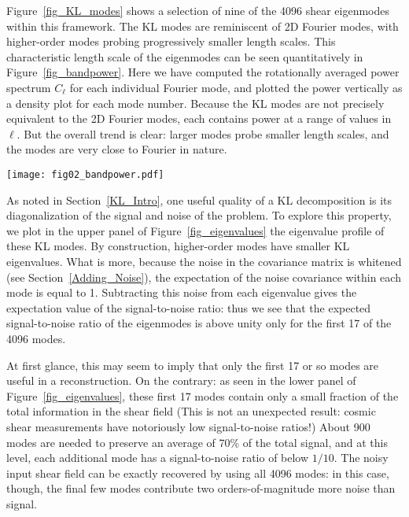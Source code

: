 Figure~\ref{fig_KL_modes} shows a selection of
nine of the 4096 shear eigenmodes within
this framework.  The KL modes are reminiscent of 2D Fourier modes, with
higher-order modes probing progressively smaller length scales.  
This characteristic length scale of the eigenmodes
can be seen quantitatively in Figure~\ref{fig_bandpower}.  
Here we have computed the rotationally averaged
power spectrum $C_\ell$ for each individual Fourier mode, and plotted the
power vertically as a density plot for each mode number.  
Because the KL modes are
not precisely equivalent to the 2D Fourier modes, each contains power at
a range of values in $\ell$.  But the overall trend is clear: larger modes
probe smaller length scales, and the modes are very close to Fourier in
nature.

\begin{figure*}
 \centering
 \texttt{[image: fig02\_bandpower.pdf]}
 \caption[The normalized power spectrum of each KL mode]
 {The normalized power spectrum of each KL mode.  For constant
   mode number, the figure represents a histogram of the power in that KL
   mode, normalized to a constant total power.  KL modes represent a 
   linear combination of Fourier modes, so that the power in each KL 
   mode is spread over a range of $\ell$ values.  Nevertheless,
   the general trend is clear: larger mode numbers are associated with
   larger wave numbers, and thus smaller length scales.
   \label{fig_bandpower} }
\end{figure*}

As noted in Section~\ref{KL_Intro}, one useful quality of a KL decomposition
is its diagonalization of the signal and noise of the problem.
To explore this property, we plot in the upper panel of 
Figure~\ref{fig_eigenvalues} the eigenvalue profile 
of these KL modes. By construction, higher-order modes 
have smaller KL eigenvalues.  What is more,
because the noise in the covariance matrix is whitened 
(see Section~\ref{Adding_Noise}), the expectation of the noise covariance
within each mode is equal to 1.  Subtracting this noise from each eigenvalue 
gives the expectation value of the signal-to-noise ratio: 
thus we see that the expected
signal-to-noise ratio of the eigenmodes is above unity only for the first
17 of the 4096 modes.

At first glance, this may seem to imply that only the first 17 or so modes
are useful in a reconstruction.  On the contrary: as seen in the lower panel
of Figure~\ref{fig_eigenvalues}, these first 17 modes contain only a
small fraction of the total information in the shear field (This is not 
an unexpected result: cosmic shear measurements have 
notoriously low signal-to-noise ratios!)
About 900 modes are needed to preserve an average of 70\% of the total signal, 
and at this level, each additional mode has a signal-to-noise ratio 
of below $1/10$.  The noisy input shear field can be exactly recovered
by using all 4096 modes: in this case, though, the final few modes 
contribute two orders-of-magnitude more noise than signal.

